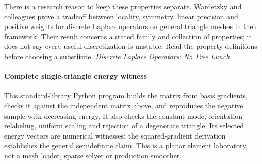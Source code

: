 There is a research reason to keep these properties separate. Wardetzky and colleagues prove a tradeoff between locality, symmetry, linear precision and positive weights for discrete Laplace operators on general triangle meshes in their framework. Their result concerns a stated family and collection of properties; it does not say every useful discretization is unstable. Read the property definitions before choosing a substitute. \href{https://www.cs.columbia.edu/cg/pdfs/1180993110-laplacian.pdf}{\emph{Discrete Laplace Operators: No Free Lunch}}.

\paragraph{Complete single-triangle energy witness}\label{03-visual-computing-i-ch002-complete-single-triangle-energy-witness}

\hypertarget{03-visual-computing-i-ch002-complete-single-triangle-energy-witness}{}

This standard-library Python program builds the matrix from basis gradients, checks it against the independent matrix above, and reproduces the negative sample with decreasing energy. It also checks the constant mode, orientation relabeling, uniform scaling and rejection of a degenerate triangle. Its selected energy vectors are numerical witnesses; the squared-gradient derivation establishes the general semidefinite claim. This is a planar element laboratory, not a mesh loader, sparse solver or production smoother.

